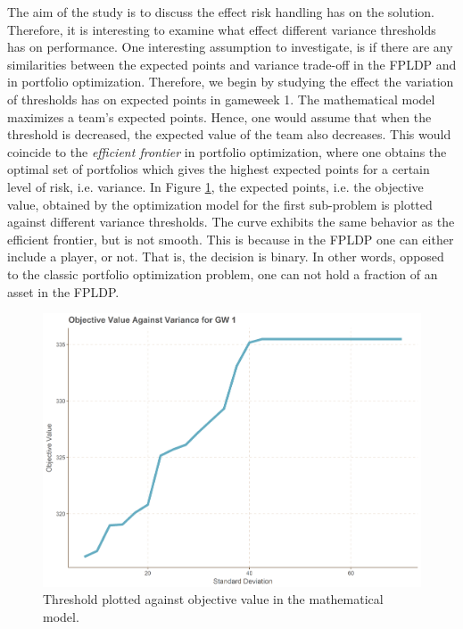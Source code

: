 The aim of the study is to discuss the effect risk handling has on the solution. Therefore, it is interesting to examine what effect different  variance thresholds has on performance. One interesting assumption to investigate, is if there are any similarities between the expected points and variance trade-off in the FPLDP and in portfolio optimization. Therefore, we begin by studying the effect the variation of thresholds has on expected points in gameweek 1. The mathematical model maximizes a team's expected points. Hence, one would assume that when the threshold is decreased, the expected value of the team also decreases. This would coincide to the \textit{efficient frontier} in portfolio optimization, where one obtains the optimal set of portfolios which gives the highest expected points for a certain level of risk, i.e. variance. In Figure \ref{fig:threshold_GW1}, the expected points, i.e. the objective value, obtained by the optimization model for the first sub-problem is plotted against different variance thresholds. The curve exhibits the same behavior as the efficient frontier, but is not smooth. This is because in the FPLDP one can either include a player, or not. That is, the decision is binary. In other words, opposed to the classic portfolio optimization problem, one can not hold a fraction of an asset in the FPLDP. 
\newpar

 
\begin{figure}[H]
    \centering
    \includegraphics[scale=0.5]{fig/chapter_7/GW1_var.png}
    \caption{Threshold plotted against objective value in the mathematical model.}
\label{fig:threshold_GW1}    
\end{figure}%


